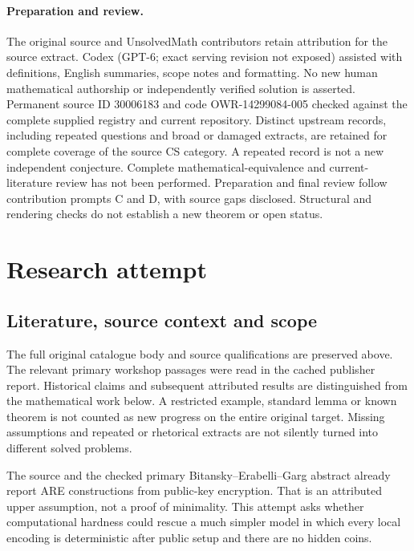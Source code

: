 \documentclass[11pt]{article}
\begin{document}
\paragraph{Preparation and review.}
The original source and UnsolvedMath contributors retain attribution for the source extract. Codex (GPT-6; exact serving revision not exposed) assisted with definitions, English summaries, scope notes and formatting. No new human mathematical authorship or independently verified solution is asserted. Permanent source ID 30006183 and code OWR-14299084-005 checked against the complete supplied registry and current repository. Distinct upstream records, including repeated questions and broad or damaged extracts, are retained for complete coverage of the source CS category. A repeated record is not a new independent conjecture. Complete mathematical-equivalence and current-literature review has not been performed. Preparation and final review follow contribution prompts C and D, with source gaps disclosed. Structural and rendering checks do not establish a new theorem or open status.
\label{end:30006183}

\section{Research attempt}
\subsection{Literature, source context and scope}
The full original catalogue body and source qualifications are preserved above. The relevant primary workshop passages were read in the cached publisher report. Historical claims and subsequent attributed results are distinguished from the mathematical work below. A restricted example, standard lemma or known theorem is not counted as new progress on the entire original target. Missing assumptions and repeated or rhetorical extracts are not silently turned into different solved problems.

The source and the checked primary Bitansky--Erabelli--Garg abstract already report ARE constructions from public-key encryption. That is an attributed upper assumption, not a proof of minimality. This attempt asks whether computational hardness could rescue a much simpler model in which every local encoding is deterministic after public setup and there are no hidden coins.
\end{document}
